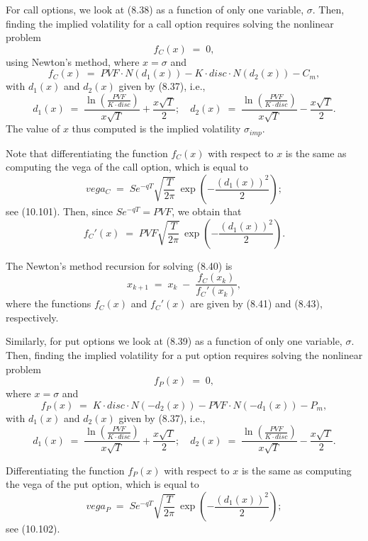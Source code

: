 
For call options, we look at (8.38) as a function of only one variable, $\sigma$. Then,
finding the implied volatility for a call option requires solving the nonlinear
problem
\begin{equation}
f_C(x) \;=\; 0,
\end{equation}
using Newton's method, where $x = \sigma$ and
\begin{equation}
f_C(x) \;=\; PVF \cdot N(d_1(x)) - K \cdot disc \cdot N(d_2(x)) - C_m,
\end{equation}
with $d_1(x)$ and $d_2(x)$ given by (8.37), i.e.,
\[
d_1(x) \;=\; \frac{\ln\left(\frac{PVF}{K\cdot disc}\right)}{x\sqrt{T}} +
\frac{x\sqrt{T}}{2}; \quad
d_2(x) \;=\; \frac{\ln\left(\frac{PVF}{K\cdot disc}\right)}{x\sqrt{T}} -
\frac{x\sqrt{T}}{2}.
\]
The value of $x$ thus computed is the implied volatility $\sigma_{imp}$.

Note that differentiating the function $f_C(x)$ with respect to $x$ is the same as
computing the vega of the call option, which is equal to
\begin{equation}
vega_C \;=\; Se^{-qT}\sqrt{\frac{T}{2\pi}}\,\exp\!\left(-\frac{(d_1(x))^2}{2}\right);
\end{equation}
see (10.101). Then, since $Se^{-qT} = PVF$, we obtain that
\begin{equation}
f_C'(x) \;=\; PVF\sqrt{\frac{T}{2\pi}}\,\exp\!\left(-\frac{(d_1(x))^2}{2}\right).
\end{equation}

The Newton's method recursion for solving (8.40) is
\begin{equation}
x_{k+1} \;=\; x_k \;-\; \frac{f_C(x_k)}{f_C'(x_k)},
\end{equation}
where the functions $f_C(x)$ and $f_C'(x)$ are given by (8.41) and (8.43),
respectively.

Similarly, for put options we look at (8.39) as a function of only one variable,
$\sigma$. Then, finding the implied volatility for a put option requires solving the
nonlinear problem
\begin{equation}
f_P(x) \;=\; 0,
\end{equation}
where $x = \sigma$ and
\begin{equation}
f_P(x) \;=\; K \cdot disc \cdot N(-d_2(x)) - PVF \cdot N(-d_1(x)) - P_m,
\end{equation}
with $d_1(x)$ and $d_2(x)$ given by (8.37), i.e.,
\[
d_1(x) \;=\; \frac{\ln\left(\frac{PVF}{K\cdot disc}\right)}{x\sqrt{T}} +
\frac{x\sqrt{T}}{2}; \quad
d_2(x) \;=\; \frac{\ln\left(\frac{PVF}{K\cdot disc}\right)}{x\sqrt{T}} -
\frac{x\sqrt{T}}{2}.
\]

Differentiating the function $f_P(x)$ with respect to $x$ is the same as computing the
vega of the put option, which is equal to
\begin{equation}
vega_P \;=\; Se^{-qT}\sqrt{\frac{T}{2\pi}}\,\exp\!\left(-\frac{(d_1(x))^2}{2}\right);
\end{equation}
see (10.102).
